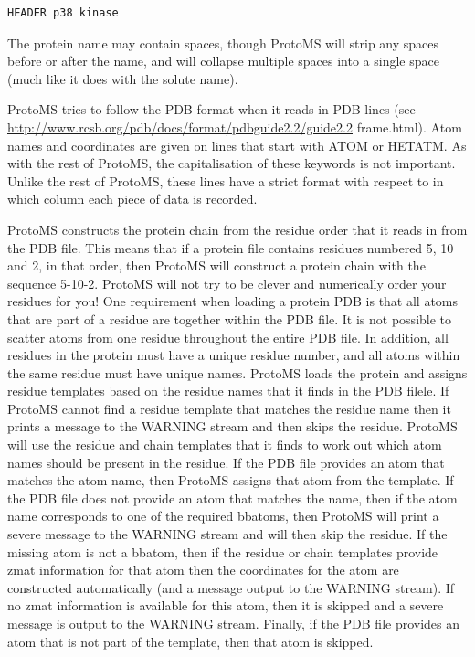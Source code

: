 \documentclass[letterpaper,10pt,english]{sphinxmanual}
\begin{document}
\begin{Verbatim}[frame=single,commandchars=\\\{\}]
HEADER p38 kinase
\end{Verbatim}

The protein name may contain spaces, though ProtoMS will strip any spaces before or after the name, and will collapse multiple spaces into a single space (much like it does with the solute name).

ProtoMS tries to follow the PDB format when it reads in PDB lines (see \href{http://www.rcsb.org/pdb/docs/format/pdbguide2.2/guide2.2}{http://www.rcsb.org/pdb/docs/format/pdbguide2.2/guide2.2} frame.html). Atom names and coordinates are given on lines that start with ATOM or HETATM. As with the rest of ProtoMS, the capitalisation of these keywords is not important. Unlike the rest of ProtoMS, these lines have a strict format with respect to in which column each piece of data is recorded.

ProtoMS constructs the protein chain from the residue order that it reads in from the PDB file. This means that if a protein file contains residues numbered 5, 10 and 2, in that order, then ProtoMS will construct a protein chain with the sequence 5-10-2. ProtoMS will not try to be clever and numerically order your residues for you! One requirement when loading a protein PDB is that all atoms that are part of a residue are together within the PDB file. It is not possible to scatter atoms from one residue throughout the entire PDB file. In addition, all residues in the protein must have a unique residue number, and all atoms within the same residue must have unique names. ProtoMS loads the protein and assigns residue templates based on the residue names that it finds in the PDB filele. If ProtoMS cannot find a residue template that matches the residue name then it prints a message to the WARNING stream and then skips the residue. ProtoMS will use the residue and chain templates that it finds to work out which atom names should be present in the residue. If the PDB file provides an atom that matches the atom name, then ProtoMS assigns that atom from the template. If the PDB file does not provide an atom that matches the name, then if the atom name corresponds to one of the required bbatoms, then ProtoMS will print a severe message to the WARNING stream and will then skip the residue. If the missing atom is not a bbatom, then if the residue or chain templates provide zmat information for that atom then the coordinates for the atom are constructed automatically (and a message output to the WARNING stream). If no zmat information is available for this atom, then it is skipped and a severe message is output to the WARNING stream. Finally, if the PDB file provides an atom that is not part of the template, then that atom is skipped.
\end{document}

